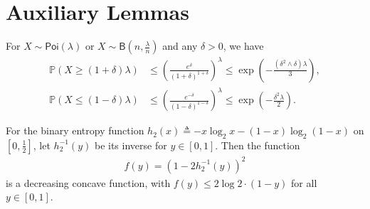 \documentclass[final,12pt]{colt2018} %
\begin{document}
\section{Auxiliary Lemmas}
\begin{lemma}\cite{mitzenmacher2005probability}\label{lemma.poissontail}
	For $X\sim \mathsf{Poi}(\lambda)$ or $X\sim \mathsf{B}(n,\frac{\lambda}{n})$ and any $\delta>0$, we have
	\begin{align*}
	\mathbb{P}(X\ge (1+\delta)\lambda) &\le \left(\frac{e^\delta}{(1+\delta)^{1+\delta}}\right)^\lambda \le \exp(-\frac{(\delta^2\wedge \delta)\lambda}{3}),\\
	\mathbb{P}(X\le (1-\delta)\lambda) &\le \left(\frac{e^{-\delta}}{(1-\delta)^{1-\delta}}\right)^\lambda \le \exp(-\frac{\delta^2\lambda}{2}).
	\end{align*}
\end{lemma}

\begin{lemma}\cite{wyner1973theorem}\label{lemma.h_2}
	For the binary entropy function $h_2(x)\triangleq -x\log_2x-(1-x)\log_2(1-x)$ on $[0,\frac{1}{2}]$, let $h_2^{-1}(y)$ be its inverse for $y\in [0,1]$. Then the function
	\begin{align*}
	f(y)= (1-2h_2^{-1}(y))^2
	\end{align*}
	is a decreasing concave function, with $f(y)\le 2\log 2\cdot (1-y)$ for all $y\in [0,1]$.
\end{lemma}
\end{document}
